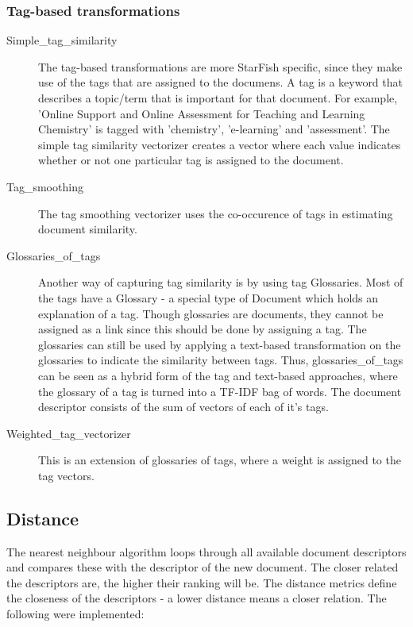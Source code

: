 \subsubsection{Tag-based transformations}
\begin{description}
\item[Simple\_tag\_similarity] The tag-based transformations are more StarFish specific, since they make use of the tags that are assigned to the documens. A tag is a keyword that describes a topic/term that is important for that document. For example, 'Online Support and Online Assessment for Teaching and Learning Chemistry' is tagged with 'chemistry', 'e-learning' and 'assessment'. The simple tag similarity vectorizer creates a vector where each value indicates whether or not one particular tag is assigned to the document. 

\item [Tag\_smoothing] The tag smoothing vectorizer uses the co-occurence of tags in estimating document similarity. %

\item [Glossaries\_of\_tags] Another way of capturing tag similarity is by using tag Glossaries. Most of the tags have a Glossary - a special type of Document which holds an explanation of a tag. Though glossaries are documents, they cannot be assigned as a link since this should be done by assigning a tag. The glossaries can still be used by applying a text-based transformation on the glossaries to indicate the similarity between tags. Thus, glossaries\_of\_tags can be seen as a hybrid form of the tag and text-based approaches, where the glossary of a tag is turned into a TF-IDF bag of words. The document descriptor consists of the sum of vectors of each of it's tags. 

\item [Weighted\_tag\_vectorizer] This is an extension of glossaries of tags, where a weight is assigned to the tag vectors. %
\end{description}

\subsection{Distance}
The nearest neighbour algorithm loops through all available document descriptors and compares these with the descriptor of the new document. The closer related the descriptors are, the higher their ranking will be. The distance metrics define the closeness of the descriptors - a lower distance means a closer relation. The following were implemented:

